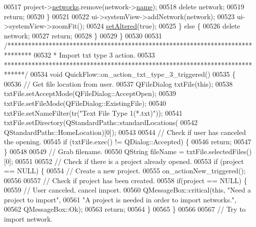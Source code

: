 \begin{DoxyCode}
00517       project->\hyperlink{class_project_aa98126154cab59769a431668e6f17daf}{networks}.remove(network->\hyperlink{class_network_ab6643733a517f930c60b06f5ffd78186}{name});
00518       \textcolor{keyword}{delete} network;
00519       \textcolor{keywordflow}{return};
00520     \}
00521 
00522     ui->systemView->addNetwork(network);
00523     ui->systemView->zoomFit();
00524     \hyperlink{group___window_ga4b63ea5ca52a9eea14db0a22b5a133f8}{setAltered}(\textcolor{keyword}{true});
00525   \} \textcolor{keywordflow}{else} \{
00526     \textcolor{keyword}{delete} network;
00527     \textcolor{keywordflow}{return};
00528   \}
00529 \}
00530 
00531 \textcolor{comment}{/*******************************************************************************}
00532 \textcolor{comment}{ * Import txt type 3 action.}
00533 \textcolor{comment}{ ******************************************************************************/}
00534 \textcolor{keywordtype}{void} QuickFlow::on\_action\_txt\_type\_3\_triggered()
00535 \{
00536   \textcolor{comment}{// Get file location from user.}
00537   QFileDialog txtFile(\textcolor{keyword}{this});
00538   txtFile.setAcceptMode(QFileDialog::AcceptOpen);
00539   txtFile.setFileMode(QFileDialog::ExistingFile);
00540   txtFile.setNameFilter(tr(\textcolor{stringliteral}{"Text File Type 1(*.txt)"}));
00541   txtFile.setDirectory(QStandardPaths::standardLocations(
00542                          QStandardPaths::HomeLocation)[0]);
00543 
00544   \textcolor{comment}{// Check if user has canceled the opening.}
00545   \textcolor{keywordflow}{if} (txtFile.exec() != QDialog::Accepted) \{
00546     \textcolor{keywordflow}{return};
00547   \}
00548 
00549   \textcolor{comment}{// Grab filename.}
00550   QString fileName = txtFile.selectedFiles()[0];
00551 
00552   \textcolor{comment}{// Check if there is a project already opened.}
00553   \textcolor{keywordflow}{if} (project == NULL) \{
00554     \textcolor{comment}{// Create a new project.}
00555     on\_actionNew\_triggered();
00556 
00557     \textcolor{comment}{// Check if project has been created.}
00558     \textcolor{keywordflow}{if}(project == NULL) \{
00559       \textcolor{comment}{// User canceled, cancel import.}
00560       QMessageBox::critical(\textcolor{keyword}{this}, \textcolor{stringliteral}{"Need a project to import"},
00561                             \textcolor{stringliteral}{"A project is needed in order to import networks."},
00562                             QMessageBox::Ok);
00563       \textcolor{keywordflow}{return};
00564     \}
00565   \}
00566 
00567   \textcolor{comment}{// Try to import network.}

\end{DoxyCode}
